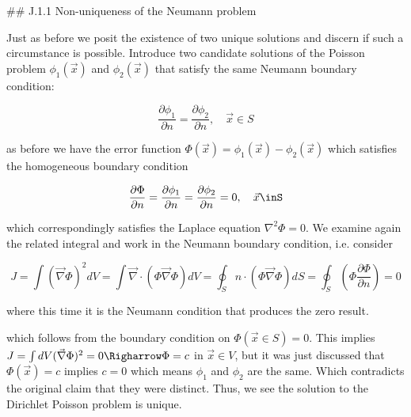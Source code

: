## J.1.1 Non-uniqueness of the Neumann problem

Just as before we posit the existence of two unique solutions and discern if such a circumstance is possible. Introduce two candidate solutions of the Poisson problem $\phi_1(\vec{x})$ and $\phi_2(\vec{x})$ that satisfy the same Neumann boundary condition:

$$\frac{\partial \phi_1}{\partial n} = \frac{\partial \phi_2}{\partial n}, \quad \vec{x}\in S$$

as before we have the error function $\Phi(\vec{x}) = \phi_1(\vec{x}) - \phi_2(\vec{x})$ which satisfies the homogeneous boundary condition

$$\frac{\partial \Phi}{\partial n}  = \frac{\partial \phi_1}{\partial n} = \frac{\partial \phi_2}{\partial n} = 0, \quad \vec{x}\inS$$

which correspondingly satisfies the Laplace equation  $\nabla^2\Phi = 0$. We examine again the related integral and work in the Neumann boundary condition, i.e. consider

$$J = \int (\vec{\nabla}\Phi)^2 dV = \int \vec{\nabla}\cdot (\Phi \vec{\nabla}\Phi) dV = \oint_S \hat{n}\cdot (\Phi \vec{\nabla}\Phi) dS = \oint_S (\Phi\frac{\partial \Phi }{\partial n}) = 0$$

where this time it is the Neumann condition that produces the zero result.







which follows from the boundary condition on $\Phi (\vec{x}\in S) = 0$. This implies $J = \int dV (\vec{\nabla}\Phi)^2 = 0 \Righarrow \Phi = c$ in $\vec{x}\in V$, but it was just discussed that $\Phi (\vec{x}) = c$ implies $c = 0$ which means $\phi_1$ and $\phi_2$ are the same. Which contradicts the original claim that they were distinct. Thus, we see the solution to the Dirichlet Poisson problem is unique. 
